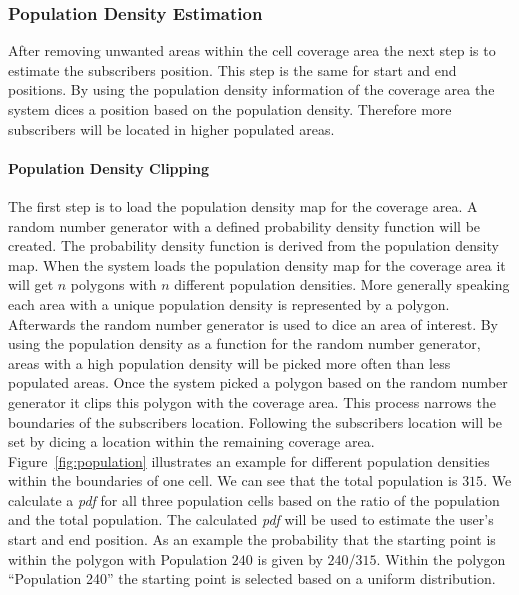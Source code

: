 \documentclass[master,english]{hgbthesis}
\begin{document}
\subsubsection{Population Density Estimation}
After removing unwanted areas within the cell coverage area the next step is to estimate the subscribers position. This step is the same for start and end positions. By using the population density information of the coverage area the system dices a position based on the population density. Therefore more subscribers will be located in higher populated areas.
\paragraph{Population Density Clipping}
The first step is to load the population density map for the coverage area. A random number generator with a defined probability density function will be created. The probability density function is derived from the population density map. When the system loads the population density map for the coverage area it will get $n$ polygons with $n$ different population densities. More generally speaking each area with a unique population density is represented by a polygon. Afterwards the random number generator is used to dice an area of interest. By using the population density as a function for the random number generator, areas with a high population density will be picked more often than less populated areas. Once the system picked a polygon based on the random number generator it clips this polygon with the coverage area. This process narrows the boundaries of the subscribers location. Following the subscribers location will be set by dicing a location within the remaining coverage area. Figure~\ref{fig:population} illustrates an example for different population densities within the boundaries of one cell. We can see that the total population is $315$. We calculate a \emph{pdf} for all three population cells based on the ratio of the population and the total population. The calculated \emph{pdf} will be used to estimate the user's start and end position. As an example the probability that the starting point is within the polygon with Population $240$ is given by $240$/$315$. Within the polygon ``Population 240'' the starting point is selected based on a uniform distribution.
\end{document}
